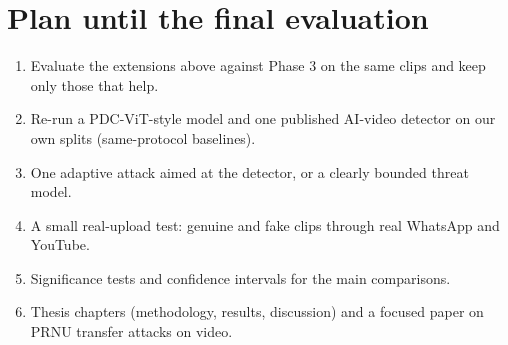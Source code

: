 \documentclass[11pt,a4paper]{article}
\begin{document}
\section{Plan until the final evaluation}
\begin{enumerate}
\item Evaluate the extensions above against Phase 3 on the same clips and keep only those that help.
\item Re-run a PDC-ViT-style model and one published AI-video detector on our own splits (same-protocol baselines).
\item One adaptive attack aimed at the detector, or a clearly bounded threat model.
\item A small real-upload test: genuine and fake clips through real WhatsApp and YouTube.
\item Significance tests and confidence intervals for the main comparisons.
\item Thesis chapters (methodology, results, discussion) and a focused paper on PRNU transfer attacks on video.
\end{enumerate}

\appendix
\end{document}
